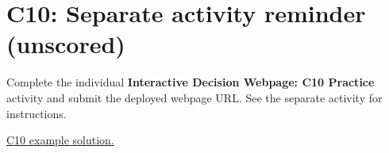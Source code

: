 \section*{C10: Separate activity reminder (unscored)}
Complete the individual \textbf{Interactive Decision Webpage: C10 Practice} activity and submit the deployed webpage URL. See the separate activity for instructions.

\href{https://nolopez338.github.io/global_economics/grade10/src/pages/term1/g10-t1-c10dashboard.html}{C10 example solution.}

